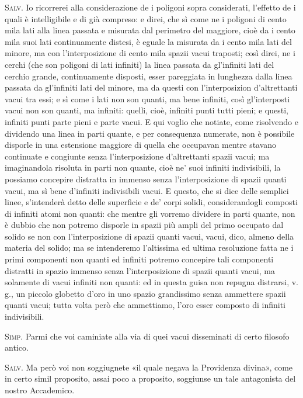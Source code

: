 \documentclass[11pt,twoside,openany]{book}
\newcommand{\speaker}[1]{\textcolor{rubric}{\textsc{#1}}\space}
\begin{document}
\speaker{Salv.} Io ricorrerei alla considerazione de i poligoni sopra considerati, l'effetto de i quali è intelligibile e di già compreso: e direi, che sì come ne i poligoni di cento mila lati alla linea passata e misurata dal perimetro del maggiore, cioè da i cento mila suoi lati continuamente distesi, è eguale la misurata da i cento mila lati del minore, ma con l'interposizione di cento mila spazii vacui traposti; così direi, ne i cerchi (che son poligoni di lati infiniti) la linea passata da gl'infiniti lati del cerchio grande, continuamente disposti, esser pareggiata in lunghezza dalla linea passata da gl'infiniti lati del minore, ma da questi con l'interposizion d'altrettanti vacui tra essi; e sì come i lati non son quanti, ma bene infiniti, così gl'interposti vacui non son quanti, ma infiniti: quelli, cioè, infiniti punti tutti pieni; e questi, infiniti punti parte pieni e parte vacui. E qui voglio che notiate, come risolvendo e dividendo una linea in parti quante, e per consequenza numerate, non è possibile disporle in una estensione maggiore di quella che occupavan mentre stavano continuate e congiunte senza l'interposizione d'altrettanti spazii vacui; ma imaginandola risoluta in parti non quante, cioè ne' suoi infiniti indivisibili, la possiamo concepire distratta in immenso senza l'interposizione di spazii quanti vacui, ma sì bene d'infiniti indivisibili vacui. E questo, che si dice delle semplici linee, s'intenderà detto delle superficie e de' corpi solidi, considerandogli composti di infiniti atomi non quanti: che mentre gli vorremo dividere in parti quante, non è dubbio che non potremo disporle in spazii più ampli del primo occupato dal solido se non con l'interposizione di spazii quanti vacui, vacui, dico, almeno della materia del solido; ma se intenderemo l'altissima ed ultima resoluzione fatta ne i primi componenti non quanti ed infiniti potremo concepire tali componenti distratti in spazio immenso senza l'interposizione di spazii quanti vacui, ma solamente di vacui infiniti non quanti: ed in questa guisa non repugna distrarsi, v. g., un piccolo globetto d'oro in uno spazio grandissimo senza ammettere spazii quanti vacui; tutta volta però che ammettiamo, l'oro esser composto di infiniti indivisibili.

\speaker{Simp.} Parmi che voi caminiate alla via di quei vacui disseminati di certo filosofo antico.

\speaker{Salv.} Ma però voi non soggiugnete «il quale negava la Providenza divina», come in certo simil proposito, assai poco a proposito, soggiunse un tale antagonista del nostro Accademico.
\end{document}
